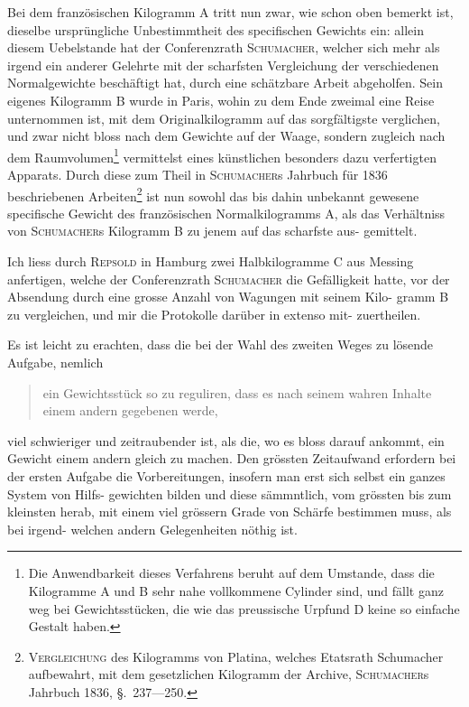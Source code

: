 \documentclass[12pt,a4paper]{article}
\theoremstyle{plain}
\theoremstyle{definition}
\theoremstyle{remark}
\begin{document}
Bei dem franz\"osischen Kilogramm A tritt nun zwar, wie schon oben bemerkt
ist, dieselbe urspr\"ungliche Unbestimmtheit des specifischen Gewichts ein: allein
diesem Uebelstande hat der Conferenzrath \textsc{Schumacher}, welcher sich mehr als
irgend ein anderer Gelehrte mit der scharfsten Vergleichung der verschiedenen
Normalgewichte besch\"aftigt hat, durch eine sch\"atzbare Arbeit abgeholfen.
Sein eigenes Kilogramm B wurde in Paris, wohin zu dem Ende zweimal
eine Reise unternommen ist, mit dem Originalkilogramm auf das sorgf\"altigste
verglichen, und zwar nicht bloss nach dem Gewichte auf der Waage, sondern
zugleich nach dem Raumvolumen\footnote{Die Anwendbarkeit dieses Verfahrens beruht auf dem Umstande, dass die
Kilogramme A und B sehr nahe vollkommene Cylinder sind, und f\"allt ganz weg bei
Gewichtsst\"ucken, die wie das preussische Urpfund D keine so einfache Gestalt haben.} vermittelst eines k\"unstlichen besonders
dazu verfertigten Apparats. Durch diese zum Theil in \textsc{Schumacher}s Jahrbuch
f\"ur 1836 beschriebenen Arbeiten\footnote{\textsc{Vergleichung} des Kilogramms von Platina,
welches Etatsrath Schumacher aufbewahrt, mit dem gesetzlichen Kilogramm der Archive,
\textsc{Schumacher}s Jahrbuch 1836, \S.~237---250.} ist nun sowohl das bis dahin unbekannt
gewesene specifische Gewicht des franz\"osischen Normalkilogramms A, als das
Verh\"altniss von \textsc{Schumacher}s Kilogramm B zu jenem auf das scharfste aus-
gemittelt.

Ich liess durch \textsc{Repsold} in Hamburg zwei Halbkilogramme C aus Messing
anfertigen, welche der Conferenzrath \textsc{Schumacher} die Gef\"alligkeit hatte, vor
der Absendung durch eine grosse Anzahl von Wagungen mit seinem Kilo-
gramm B zu vergleichen, und mir die Protokolle dar\"uber in extenso mit-
zuertheilen.

Es ist leicht zu erachten, dass die bei der Wahl des zweiten Weges zu
l\"osende Aufgabe, nemlich
\begin{quote}
ein Gewichtsst\"uck so zu reguliren, dass es nach seinem wahren Inhalte
einem andern gegebenen werde,
\end{quote}
viel schwieriger und zeitraubender
ist, als die, wo es bloss darauf ankommt, ein Gewicht einem andern gleich
zu machen. Den gr\"ossten Zeitaufwand erfordern bei der ersten Aufgabe die
Vorbereitungen, insofern man erst sich selbst ein ganzes System von Hilfs-
gewichten bilden und diese s\"ammntlich, vom gr\"ossten bis zum kleinsten herab,
mit einem viel gr\"ossern Grade von Sch\"arfe bestimmen muss, als bei irgend-
welchen andern Gelegenheiten n\"othig ist.
\end{document}
